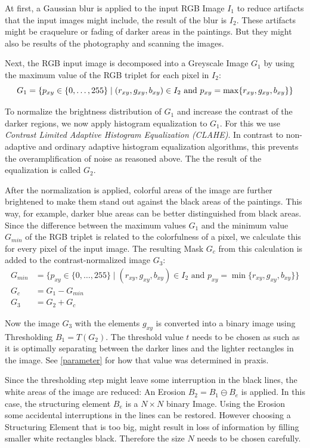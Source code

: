 \documentclass[serif,article,noparskip]{agse-thesis}
\begin{document}
At first, a Gaussian blur is applied to the input RGB Image $I_1$ to reduce
artifacts that the input images might include, the result of the blur is $I_2$.
These artifacts might be craquelure or fading of darker areas in the paintings.
But they might also be results of the photography and scanning the images.

Next, the RGB input image is decomposed into a Greyscale Image $G_1$ by using
the maximum value of the RGB triplet for each pixel in $I_2$:
\begin{equation}
G_1 = \{p_{xy} \in \{0,\ldots,255\} \mid (r_{xy},g_{xy},b_{xy})\in I_2\text{ and }p_{xy}=\max\{r_{xy},g_{xy},b_{xy}\}\}\\
\end{equation}

To normalize the brightness distribution of $G_1$ and increase the contrast of
the darker regions, we now apply histogram equalization to $G_1$. For this we
use \textit{Contrast Limited Adaptive Histogram Equalization (CLAHE)}. In
contrast to non-adaptive and ordinary adaptive histogram equalization
algorithms, this prevents the overamplification of noise as reasoned above. The
the result of the equalization is called $G_2$. \cite{Pizer1987}

After the normalization is applied, colorful areas of the image are further
brightened to make them stand out against the black areas of the paintings. This
way, for example, darker blue areas can be better distinguished from black
areas. Since the difference between the maximum values $G_1$ and the minimum
value $G_{min}$ of the RGB triplet is related to the colorfulness of a pixel, we
calculate this for every pixel of the input image. The resulting Mask $G_c$ from
this calculation is added to the contrast-normalized image $G_3$:
\begin{align}
G_{min} &= \{p_{xy} \in \{0,\ldots,255\} \mid (r_{xy},g_{xy},b_{xy})\in I_2\text{ and }p_{xy}=\min\{r_{xy},g_{xy},b_{xy}\}\}\\
G_c &= G_1 - G_{min}\\
G_3 &= G_2 + G_c
\end{align}

Now the image $G_3$ with the elements $g_{xy}$ is converted into a binary image
using Thresholding $B_1 = T(G_2)$. The threshold value $t$ needs to be chosen as
such as it is optimally separating between the darker lines and the lighter
rectangles in the image. See \ref{parameter} for how that value was determined
in praxis.

Since the thresholding step might leave some interruption in the black lines,
the white areas of the image are reduced: An Erosion $B_2 = B_1 \ominus B_e$ is
applied. In this case, the structuring element $B_e$ is a $N\times N$ binary
Image. Using the Erosion some accidental interruptions in the lines can be
restored. However choosing a Structuring Element that is too big, might result
in loss of information by filling smaller white rectangles black. Therefore the
size $N$ needs to be chosen carefully.
\end{document}
